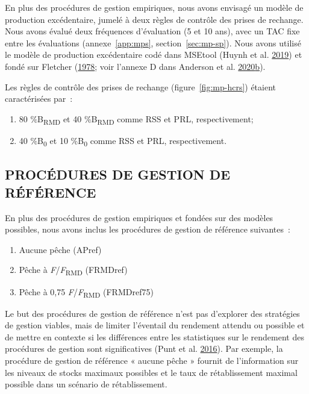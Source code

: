 \documentclass[french,11pt]{book}
\begin{document}
En plus des procédures de gestion empiriques, nous avons envisagé un modèle de production excédentaire, jumelé à deux règles de contrôle des prises de rechange. Nous avons évalué deux fréquences d'évaluation (5 et 10 ans), avec un TAC fixe entre les évaluations (annexe~\ref{app:mps}, section~\ref{sec:mp-sp}). Nous avons utilisé le modèle de production excédentaire codé dans MSEtool (Huynh et al. \protect\hyperlink{ref-huynh_msetool_2019}{2019}) et fondé sur Fletcher (\protect\hyperlink{ref-fletcher1978}{1978}; voir l'annexe D dans Anderson et al. \protect\hyperlink{ref-anderson2020gfmp}{2020}\protect\hyperlink{ref-anderson2020gfmp}{b}).

Les règles de contrôle des prises de rechange (figure~\ref{fig:mp-hcrs}) étaient caractérisées par~:
\begin{enumerate}
\def\labelenumi{\arabic{enumi}.}

\item
  80 \%B\textsubscript{RMD} et 40 \%B\textsubscript{RMD} comme RSS et PRL, respectivement;
\item
  40 \%B\textsubscript{0} et 10 \%B\textsubscript{0} comme RSS et PRL, respectivement.
\end{enumerate}
\hypertarget{procuxe9dures-de-gestion-de-ruxe9fuxe9rence}{%
\subsection{PROCÉDURES DE GESTION DE RÉFÉRENCE}\label{procuxe9dures-de-gestion-de-ruxe9fuxe9rence}}

En plus des procédures de gestion empiriques et fondées sur des modèles possibles, nous avons inclus les procédures de gestion de référence suivantes~:
\begin{enumerate}
\def\labelenumi{\arabic{enumi}.}

\item
  Aucune pêche (APref)
\item
  Pêche à \emph{F}/\emph{F}\textsubscript{RMD} (FRMDref)
\item
  Pêche à 0,75 \emph{F}/\emph{F}\textsubscript{RMD} (FRMDref75)
\end{enumerate}
Le but des procédures de gestion de référence n'est pas d'explorer des stratégies de gestion viables, mais de limiter l'éventail du rendement attendu ou possible et de mettre en contexte si les différences entre les statistiques sur le rendement des procédures de gestion sont significatives (Punt et al. \protect\hyperlink{ref-punt2016}{2016}). Par exemple, la procédure de gestion de référence « aucune pêche » fournit de l'information sur les niveaux de stocks maximaux possibles et le taux de rétablissement maximal possible dans un scénario de rétablissement.
\end{document}
